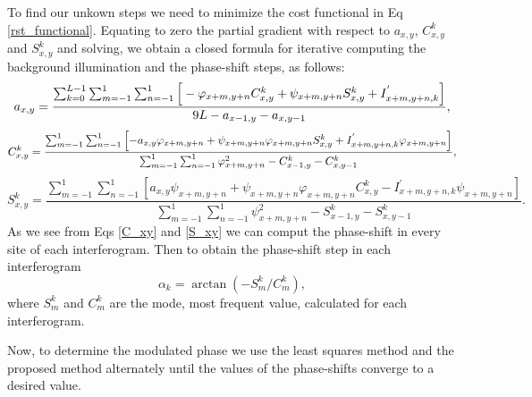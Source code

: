 \documentclass[letterpaper,12pt]{article}   %
\begin{document}
To find our unkown steps we need to minimize the cost functional in Eq 
\ref{rst_functional}. Equating to zero the partial gradient with respect to $a_{x,y}$, 
$C_{x,y}^k$ and $S_{x,y}^k$ and solving, we obtain a closed formula for iterative 
computing the background illumination and the phase-shift steps, as follows:
\begin{equation}
	a_{x,y} = \frac{ \sum_{k=0}^{L-1} \sum_{m=-1}^{1} \sum_{n=-1}^{1} \left[\\					-\varphi_{x+m,y+n}C_{x,y}^k+\psi_{x+m,y+n}S_{x,y}^k+I_{x+m,y+n,k}^{'} \right] }
	{ 9L - a_{x-1,y}-a_{x,y-1}},
\end{equation}
\begin{equation}\label{C_xy}
	C_{x,y}^k = \frac{ \sum_{m=-1}^{1} \sum_{n=-1}^{1} \left[ -a_{x,y} \varphi_{x+m,y+n}+
	\psi_{x+m,y+n} \varphi_{x+m,y+n} S_{x,y}^k +\\ 		I_{x+m,y+n,k}^{'}
	\varphi_{x+m,y+n} \right] } { \sum_{m=-1}^{1} \sum_{n=-1}^{1} \varphi_{x+m,y+n}^2 -
	C_{x-1,y}^k-C_{x,y-1}^k },
\end{equation}
\begin{equation}\label{S_xy}
	S_{x,y}^k = \frac{ \sum_{m=-1}^{1} \sum_{n=-1}^{1} \left[ a_{x,y} \psi_{x+m,y+n} +
	\psi_{x+m,y+n} \varphi_{x+m,y+n} C_{x,y}^k-I_{x+m,y+n,k}^{'} \psi_{x+m,y+n} \right]}
	{ \sum_{m=-1}^{1} \sum_{n=-1}^{1} \psi_{x+m,y+n}^2 - S_{x-1,y}^k - S_{x,y-1}^k }.
\end{equation}
As we see from Eqs \ref{C_xy} and \ref{S_xy} we can comput the phase-shift in every site
of each interferogram. Then to obtain the phase-shift step in each interferogram
\begin{equation}
	\alpha_k = \arctan(-S_m^k/C_m^k),
\end{equation}
where $S_m^k$ and $C_m^k$ are the mode, most frequent value, calculated for each
interferogram.

Now, to determine the modulated phase we use the least squares method and the proposed
method alternately until the values ​​of the phase-shifts converge to a desired value.

\end{document}
